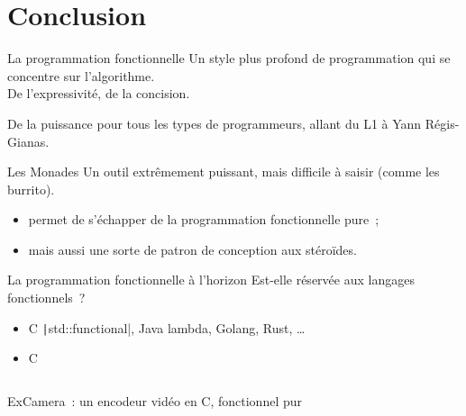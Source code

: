 \documentclass[10pt]{beamer}
\newcommand\CXX{C\nolinebreak[4]\hspace{-.05em}\raisebox{.4ex}{\relsize{-3}{\textbf{++}}}}
\begin{document}
\section{Conclusion}

\begin{frame}{La programmation fonctionnelle}
  Un style plus profond de programmation qui se concentre sur
  l'algorithme.\\
  De l'expressivité, de la concision.

  De la puissance pour tous les types de programmeurs, allant du L1 à
  Yann Régis-Gianas.
\end{frame}

\begin{frame}{Les Monades}
  Un outil extrêmement puissant, mais difficile à saisir (comme les
  burrito).

  \begin{itemize}
  \item permet de s'échapper de la programmation fonctionnelle pure~;
  \item mais aussi une sorte de patron de conception aux stéroïdes.
  \end{itemize}
\end{frame}

\begin{frame}{La programmation fonctionnelle à l'horizon}
  Est-elle réservée aux langages fonctionnels~?
  \begin{itemize}
  \item \CXX{} \texttt|std::functional|, Java lambda, Golang, Rust, …
  \item C \inputminted{c}{./attributes.c}
  \end{itemize}

  ExCamera~\cite{fouladi2017encoding}: un encodeur vidéo en \CXX{},
  fonctionnel pur
\end{frame}

\begin{frame}[allowframebreaks]
  \nocite{*}
  \printbibliography{}
\end{frame}
\end{document}
